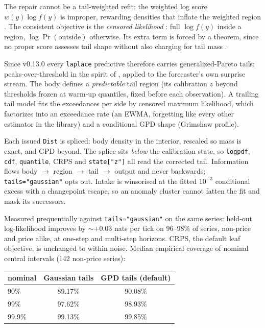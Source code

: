 \documentclass[article]{jss}
\providecommand{\code}[1]{\texttt{#1}}
\begin{document}
The repair cannot be a tail-weighted refit: the
weighted log score $w(y)\log f(y)$ is improper, rewarding densities that
inflate the weighted region \citep{gneiting2011comparing}. The consistent
objective is the \emph{censored likelihood} \citep{diks2011likelihood}:
full $\log f(y)$ inside a region, $\log \Pr(\text{outside})$ otherwise.
Its extra term is forced by a theorem, since no proper score assesses tail
shape without also charging for tail mass \citep{brehmer2019tails}.

Since v0.13.0 every \code{laplace} predictive therefore carries
generalized-Pareto tails: peaks-over-threshold in the spirit of
\citet{siffer2017anomaly}, applied to the forecaster's own surprise stream.
The body defines a \emph{predictable} tail region (its calibration $z$
beyond thresholds frozen at warm-up quantiles, fixed before each
observation). A trailing tail model fits the exceedances per side by
censored maximum likelihood, which factorizes into an exceedance rate (an
EWMA, forgetting like every other estimator in the library) and a
conditional GPD shape (Grimshaw profile).

Each issued \code{Dist} is spliced: body density in the interior,
rescaled so mass is exact, and GPD beyond. The splice sits \emph{below}
the calibration state, so \code{logpdf}, \code{cdf}, \code{quantile},
CRPS and \code{state["z"]} all read the corrected tail. Information flows body $\to$ region $\to$ tail $\to$ output
and never backwards; \code{tails="gaussian"} opts out. Intake is winsorised
at the fitted $10^{-3}$ conditional excess with a changepoint escape, so an
anomaly cluster cannot fatten the fit and mask its successors.

Measured prequentially against \code{tails="gaussian"} on the same series:
held-out log-likelihood improves by ${\sim}+0.03$ nats per tick on 96--98\%
of series, non-price and price alike, at one-step and multi-step horizons.
CRPS, the default leaf objective, is unchanged to within noise.
Median empirical coverage of nominal central intervals (142 non-price
series):

\begin{center}
\begin{tabular}{lcc}
\hline
nominal & Gaussian tails & GPD tails (default) \\
\hline
90\%   & 89.17\% & 90.08\% \\
99\%   & 97.62\% & 98.93\% \\
99.9\% & 99.13\% & 99.85\% \\
\hline
\end{tabular}
\end{center}
\end{document}
